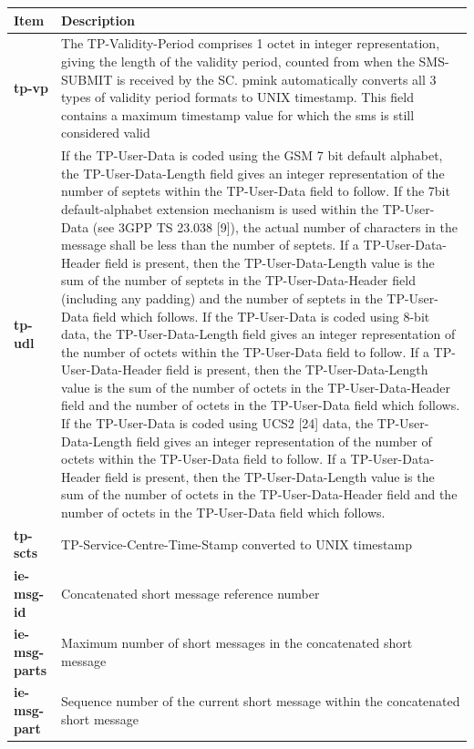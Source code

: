 \documentclass[a4paper,latin]{paper}
\begin{document}
\noindent\begin{tabularx}{\textwidth}{ | l | X |}
	\hline
	Item	 				& Description \\
	\hline
	\textbf{tp-vp}				& The TP-Validity-Period comprises 1 octet in integer representation, giving the length of the validity period, counted 
						  from when the SMS-SUBMIT is received by the SC. \acrfull{pmink} automatically converts all 3 types of validity period formats
						  to UNIX timestamp. This field contains a maximum timestamp value for which the \acrshort{sms} is still considered valid\\ 
	\textbf{tp-udl}				& If the TP-User-Data is coded using the GSM 7 bit default alphabet, the TP-User-Data-Length field gives an integer 
						  representation of the number of septets within the TP-User-Data field to follow. If the 7bit default-alphabet extension 
						  mechanism is used within the TP-User-Data (see 3GPP TS 23.038 [9]), the actual number of characters in the message 
						  shall be less than the number of septets. If a TP-User-Data-Header field is present, then the TP-User-Data-Length value 
						  is the sum of the number of septets in the TP-User-Data-Header field (including any padding) and the number of septets 
						  in the TP-User-Data field which follows. If the TP-User-Data is coded using 8-bit data, the 
						  TP-User-Data-Length field gives an integer representation of the number of octets within the TP-User-Data field to 
						  follow. If a TP-User-Data-Header field is present, then the TP-User-Data-Length value is the sum of the number of 
						  octets in the TP-User-Data-Header field and the number of octets in the TP-User-Data field which follows.
						  If the TP-User-Data is coded using UCS2 [24] data, the TP-User-Data-Length field gives an integer representation of 
						  the number of octets within the TP-User-Data field to follow. If a TP-User-Data-Header field is present, then the 
						  TP-User-Data-Length value is the sum of the number of octets in the TP-User-Data-Header field and the number of 
						  octets in the TP-User-Data field which follows. \\ 
	\textbf{tp-scts}			& TP-Service-Centre-Time-Stamp converted to UNIX timestamp\\ 
	\textbf{ie-msg-id}			& Concatenated short message reference number\\ 
	\textbf{ie-msg-parts}			& Maximum number of short messages in the concatenated short message \\ 
	\textbf{ie-msg-part}			& Sequence number of the current short message within the concatenated short message \\ 

\end{tabularx}
\end{document}
